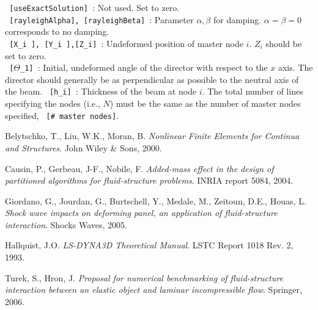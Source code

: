 \documentclass{article}
\begin{document}
\texttt{ [useExactSolution] }:  Not used.  Set to zero. \\
\texttt{ [rayleighAlpha], [rayleighBeta]  }: Parameter $\alpha,\beta$ for damping.  $\alpha=\beta = 0$ corresponds to no damping. \\
\texttt{ [X\_i ], [Y\_i ],[Z\_i]  }: Undeformed position of master node $i$.  $Z_i$ should be set to zero. \\
\texttt{ [$\Theta$\_1] }: Initial, undeformed angle of the director with respect to the $x$ axis.  The director should generally be as perpendicular as possible to the neutral axis of the beam.
\texttt{ [h\_i] }: Thickness of the beam at node $i$.
The total number of lines specifying the nodes (i.e., $N$) must be the same as the number of master nodes specified, \texttt{ [\# master nodes]}.

\begin{thebibliography}{9}

  Belytschko, T., Liu, W.K., Moran, B. 
  \emph{Nonlinear Finite Elements for Continua and Structures}.
  John Wiley \& Sons,
  2000.

  Causin, P., Gerbeau, J-F., Nobile, F.
  \emph{Added-mass effect in the design of partitioned algorithms for fluid-structure problems}.
  INRIA report 5084,
  2004.

  Giordano, G., Jourdan, G., Burtschell, Y., Medale, M., Zeitoun, D.E., Houas, L.
  \emph{Shock wave impacts on deforming panel, an application of fluid-structure interaction}.
  Shocks Waves,
  2005.

  Hallquist, J.O.
  \emph{LS-DYNA3D Theoretical Manual}.
  LSTC Report 1018 Rev. 2,
  1993.


  Turek, S., Hron, J.
  \emph{Proposal for numerical benchmarking of fluid-structure interaction between an elastic object and laminar incompressible flow}.
  Springer,
  2006.


\end{thebibliography}
\end{document}
